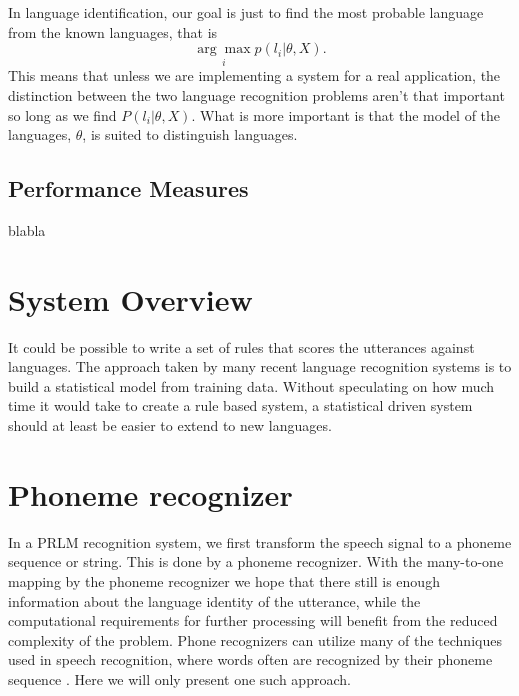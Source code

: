  In language identification, our goal is just to find the most probable language from the known languages, that is
\begin{equation}
\label{lreiddec}
\underset{i}{\arg \max} p(l_i | \theta, X).
\end{equation}
This means that unless we are implementing a system for a real application, the distinction between the two language recognition problems aren't that important so long as we find $P(l_i | \theta, X)$. What is more important is that the model of the languages, $\theta$, is suited to distinguish languages.

\subsection{Performance Measures}

blabla

\section{System Overview}
\label{sect:sysoverview}

It could be possible to write a set of rules that scores the utterances against languages. The approach taken by many recent language recognition systems is to build a statistical model from training data. Without speculating on how much time it would take to create a rule based system, a statistical driven system should at least be easier to extend to new languages.


\section{Phoneme recognizer}
\label{sect:phnrec}

In a PRLM recognition system, we first transform the speech signal to a phoneme sequence or string. This is done by a phoneme recognizer. With the many-to-one mapping by the phoneme recognizer we hope that there still is enough information about the language identity of the utterance, while the computational requirements for further processing will benefit from the reduced complexity of the problem. Phone recognizers can utilize many of the techniques used in speech recognition,  where words often are recognized by their phoneme sequence \cite[p. 414]{talegk}. Here we will only present one such approach.

